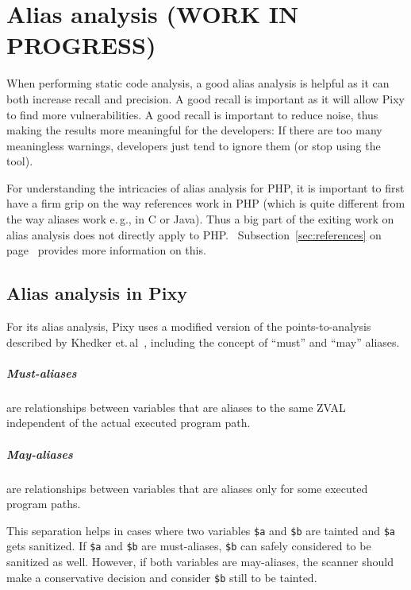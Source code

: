 \chapter{Alias analysis (WORK IN PROGRESS)}

When performing static code analysis, a good alias analysis is helpful as it can both increase recall and precision. A good recall is important as it will allow Pixy to find more vulnerabilities. A good recall is important to reduce noise, thus making the results more meaningful for the developers: If there are too many meaningless warnings, developers just tend to ignore them (or stop using the tool).~\cite{understanding-value}

For understanding the intricacies of alias analysis for PHP, it is important to first have a firm grip on the way references work in PHP (which is quite different from the way aliases work e.\,g., in C or Java). Thus a big part of the exiting work on alias analysis does not directly apply to PHP.~\cite[page~24]{pixy} Subsection~\ref{sec:references} on page~\pageref{sec:references} provides more information on this.

\section{Alias analysis in Pixy}

For its alias analysis, Pixy uses a modified version of the points-to-analysis described by Khedker et.\,al~\cite[page 119ff]{data-flow-analysis}, including the concept of ``must'' and ``may'' aliases.

\paragraph{Must-aliases} are relationships between variables that are aliases to the same ZVAL independent of the actual executed program path.

\paragraph{May-aliases} are relationships between variables that are aliases only for some executed program paths.

This separation helps in cases where two variables \texttt{\$a} and \texttt{\$b} are tainted and \texttt{\$a} gets sanitized. If \texttt{\$a} and \texttt{\$b} are must-aliases, \texttt{\$b} can safely considered to be sanitized as well. However, if both variables are may-aliases, the scanner should make a conservative decision and consider \texttt{\$b} still to be tainted.


